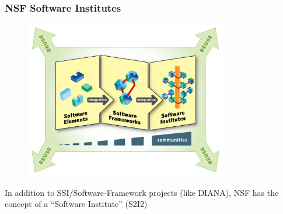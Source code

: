 \begin{frame}
\frametitle{NSF Software Institutes}

\begin{figure}[htbp]
\begin{center}
\includegraphics[width=0.8\textwidth]{images/nsf-si2-classes.png}
\end{center}
\end{figure}

\small{In addition to SSI/Software-Framework projects (like DIANA), NSF has the concept of a ``Software Institute'' (S2I2)}

\end{frame}


